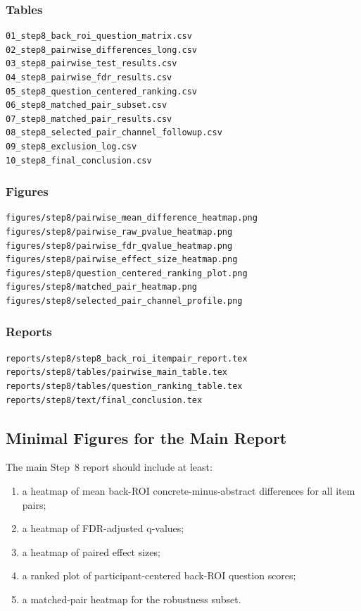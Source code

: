 \subsubsection*{Tables}
\begin{verbatim}
01_step8_back_roi_question_matrix.csv
02_step8_pairwise_differences_long.csv
03_step8_pairwise_test_results.csv
04_step8_pairwise_fdr_results.csv
05_step8_question_centered_ranking.csv
06_step8_matched_pair_subset.csv
07_step8_matched_pair_results.csv
08_step8_selected_pair_channel_followup.csv
09_step8_exclusion_log.csv
10_step8_final_conclusion.csv
\end{verbatim}

\subsubsection*{Figures}
\begin{verbatim}
figures/step8/pairwise_mean_difference_heatmap.png
figures/step8/pairwise_raw_pvalue_heatmap.png
figures/step8/pairwise_fdr_qvalue_heatmap.png
figures/step8/pairwise_effect_size_heatmap.png
figures/step8/question_centered_ranking_plot.png
figures/step8/matched_pair_heatmap.png
figures/step8/selected_pair_channel_profile.png
\end{verbatim}

\subsubsection*{Reports}
\begin{verbatim}
reports/step8/step8_back_roi_itempair_report.tex
reports/step8/tables/pairwise_main_table.tex
reports/step8/tables/question_ranking_table.tex
reports/step8/text/final_conclusion.tex
\end{verbatim}

\subsection{Minimal Figures for the Main Report}
The main Step~8 report should include at least:
\begin{enumerate}
    \item a heatmap of mean back-ROI concrete-minus-abstract differences for all item pairs;
    \item a heatmap of FDR-adjusted q-values;
    \item a heatmap of paired effect sizes;
    \item a ranked plot of participant-centered back-ROI question scores;
    \item a matched-pair heatmap for the robustness subset.
\end{enumerate}

